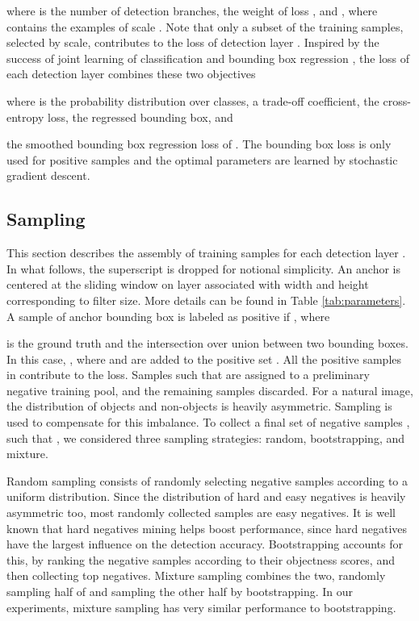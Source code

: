\documentclass[runningheads]{llncs}
\begin{document}
where   is the number of detection branches,   the weight of
loss , and , where  contains
the examples of scale . Note that only a subset  of the training
samples, selected by scale, contributes to the loss of detection layer .
Inspired by the success of joint learning of classification and bounding box
regression
\cite{DBLP:conf/iccv/Girshick15,DBLP:conf/nips/shaoqing15fasterRcnn}, the
loss of each detection layer combines these two objectives

where  is the probability distribution over
classes,  a trade-off coefficient,  the
cross-entropy loss,  the
regressed bounding box, and

the smoothed bounding box regression loss of \cite{DBLP:conf/iccv/Girshick15}.
The bounding box loss is only used for positive samples and the
optimal parameters 
are learned by stochastic gradient descent.



\subsection{Sampling}
This section describes the assembly of training samples
 for each detection layer . In what follows,
the superscript  is dropped for notional simplicity. An anchor is centered at the sliding window on layer  associated with width and height corresponding to filter size. More details can be found in Table \ref{tab:parameters}. A sample  of anchor bounding box  is labeled as positive if , where

 is the ground truth and  the intersection over union between
two bounding boxes. In this case, , where  and  are added to
the positive set . All the positive samples in  contribute to the loss. Samples such that  are assigned to a preliminary negative training pool, and the remaining samples discarded. For a natural image, the distribution of objects and non-objects is heavily asymmetric. Sampling is used to compensate for this imbalance. To collect a final set of negative samples , such that , we considered three sampling strategies: random, bootstrapping, and mixture.

Random sampling consists of randomly selecting negative samples according to a uniform distribution. Since the distribution of hard and easy negatives is heavily asymmetric too, most randomly collected samples are easy negatives.
It is well known that hard negatives mining helps boost performance, since hard negatives have the largest influence on the detection accuracy. Bootstrapping accounts for this, by ranking the negative samples according to their objectness scores, and then collecting top  negatives.  Mixture sampling combines the two, randomly sampling half of 
and sampling the other half by bootstrapping. In our experiments, mixture sampling has very similar performance to bootstrapping.
\end{document}
